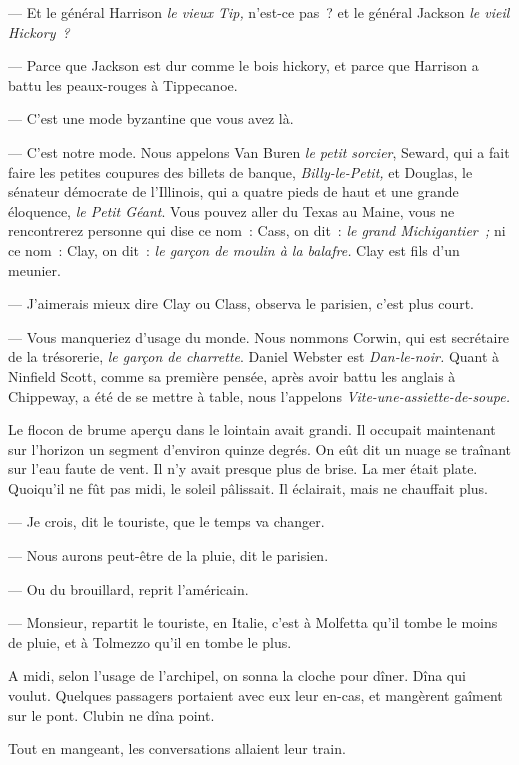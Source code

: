 \documentclass[french,twoside]{book} %
\begin{document}
— Et le général Harrison \emph{le vieux Tip,} n’est-ce pas ? et le général Jackson \emph{le vieil Hickory ?}\par
— Parce que Jackson est dur comme le bois hickory, et parce que Harrison a battu les peaux-rouges à Tippecanoe.\par
— C’est une mode byzantine que vous avez là.\par
— C’est notre mode. Nous appelons Van Buren \emph{le petit sorcier}, Seward, qui a fait faire les petites coupures des billets de banque, \emph{Billy-le-Petit,} et Douglas, le sénateur démocrate de l’Illinois, qui a quatre pieds de haut et une grande éloquence, \emph{le Petit Géant}. Vous pouvez aller du Texas au Maine, vous ne rencontrerez personne qui dise ce nom : Cass, on dit : \emph{le grand Michigantier ;} ni ce nom : Clay, on dit : \emph{le garçon de moulin à la balafre.} Clay est fils d’un meunier.\par
— J’aimerais mieux dire Clay ou Class, observa le parisien, c’est plus court.\par
— Vous manqueriez d’usage du monde. Nous nommons Corwin, qui est secrétaire de la trésorerie, \emph{le  garçon de charrette}. Daniel Webster est \emph{Dan-le-noir. }Quant à Ninfield Scott, comme sa première pensée, après avoir battu les anglais à Chippeway, a été de se mettre à table, nous l’appelons \emph{Vite-une-assiette-de-soupe.}\par
Le flocon de brume aperçu dans le lointain avait grandi. Il occupait maintenant sur l’horizon un segment d’environ quinze degrés. On eût dit un nuage se traînant sur l’eau faute de vent. Il n’y avait presque plus de brise. La mer était plate. Quoiqu’il ne fût pas midi, le soleil pâlissait. Il éclairait, mais ne chauffait plus.\par
— Je crois, dit le touriste, que le temps va changer.\par
— Nous aurons peut-être de la pluie, dit le parisien.\par
— Ou du brouillard, reprit l’américain.\par
— Monsieur, repartit le touriste, en Italie, c’est à Molfetta qu’il tombe le moins de pluie, et à Tolmezzo qu’il en tombe le plus.\par
A midi, selon l’usage de l’archipel, on sonna la cloche pour dîner. Dîna qui voulut. Quelques passagers portaient avec eux leur en-cas, et mangèrent gaîment sur le pont. Clubin ne dîna point.\par
Tout en mangeant, les conversations allaient leur train.\par
\end{document}
